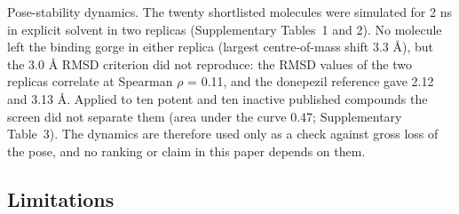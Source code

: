 \documentclass[11pt,a4paper]{article}
\begin{document}
\begin{table}[htb]
\centering\small
\caption{Time-split validation of the activity design: ROC-AUC (95 \% bootstrap interval) on compounds first reported after the cutoff year. Prim.: the activity design; NN: nearest-neighbour similarity to training actives; Desc.: logistic regression on eight descriptors. The pre-specified bar (2015, least-similar third) was not met.}
\label{tab:time}
\end{table}

Pose-stability dynamics. The twenty shortlisted molecules were simulated for 2 ns in explicit solvent in two replicas (Supplementary Tables~1 and 2). No molecule left the binding gorge in either replica (largest centre-of-mass shift 3.3 \AA{}), but the 3.0 \AA{} RMSD criterion did not reproduce: the RMSD values of the two replicas correlate at Spearman $\rho$ = 0.11, and the donepezil reference gave 2.12 and 3.13 \AA{}. Applied to ten potent and ten inactive published compounds the screen did not separate them (area under the curve 0.47; Supplementary Table~3). The dynamics are therefore used only as a check against gross loss of the pose, and no ranking or claim in this paper depends on them.



\subsection{Limitations}
\label{sec:3.5}
\end{document}
